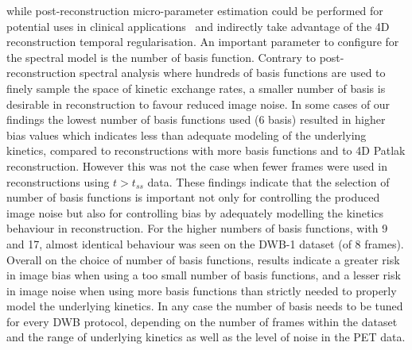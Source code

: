 while post-reconstruction micro-parameter estimation could be performed for potential uses in clinical applications~\cite{Novosad2016b,Zaker2020} and indirectly take advantage of the 4D reconstruction temporal regularisation.
An important parameter to configure for the spectral model is the number of basis function. 
Contrary to post-reconstruction spectral analysis where hundreds of basis functions are used to finely sample the space of kinetic exchange rates, a smaller number of basis is desirable in reconstruction to favour reduced image noise.
In some cases of our findings the lowest number of basis functions used (6 basis) resulted in higher bias values which indicates less than adequate modeling of the underlying kinetics, compared to reconstructions with more basis functions and to 4D Patlak reconstruction. However this was not the case when fewer frames were used in reconstructions using $t>t_{ss}$ data. 
These findings indicate that the selection of number of basis functions is important not only for controlling the produced image noise but also for controlling bias by adequately modelling the kinetics behaviour in reconstruction. 
For the higher numbers of basis functions, with 9 and 17, almost identical behaviour was seen on the DWB-1 dataset (of 8 frames). 
Overall on the choice of number of basis functions, results indicate a greater risk in image bias when using a too small number of basis functions, and a lesser risk in image noise when using more basis functions than strictly needed to properly model the underlying kinetics.
In any case the number of basis needs to be tuned for every DWB protocol, depending on the number of frames within the dataset and the range of underlying kinetics as well as the level of noise in the PET data.

